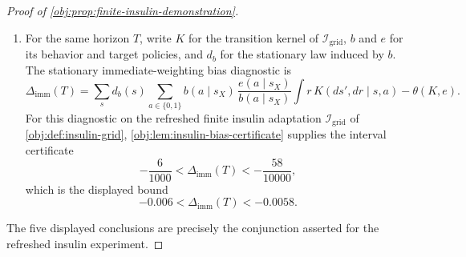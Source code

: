 \documentclass[11pt]{article}
\begin{document}
\begin{proof}[Proof of \cref{obj:prop:finite-insulin-demonstration}]
\begin{enumerate}
\item For the same horizon \(T\), write \(K\) for the transition kernel of \(\mathcal I_{\mathrm{grid}}\), \(b\) and \(e\) for its behavior and target policies, and \(d_b\) for the stationary law induced by \(b\). The stationary immediate-weighting bias diagnostic is
\[
\Delta_{\mathrm{imm}}(T)
=
\sum_s d_b(s)
\sum_{a\in\{0,1\}}
b(a\mid s_X)\,
\frac{e(a\mid s_X)}{b(a\mid s_X)}
\int r\,K(ds',dr\mid s,a)
-
\theta(K,e).
\]
For this diagnostic on the refreshed finite insulin adaptation \(\mathcal I_{\mathrm{grid}}\) of \cref{obj:def:insulin-grid}, \cref{obj:lem:insulin-bias-certificate} supplies the interval certificate
\[
-\frac6{1000}
<
\Delta_{\mathrm{imm}}(T)
<
-\frac{58}{10000},
\]
which is the displayed bound
\[
-0.006<\Delta_{\mathrm{imm}}(T)<-0.0058.
\]
\end{enumerate}

The five displayed conclusions are precisely the conjunction asserted for the refreshed insulin experiment. %
\end{proof}




\end{document}
